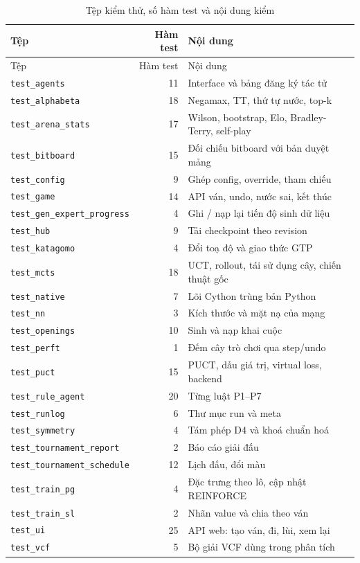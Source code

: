 \par{\footnotesize
\renewcommand{\arraystretch}{0.95}
\begin{longtable}{lrp{8.2cm}}
  \caption{Tệp kiểm thử, số hàm test và nội dung kiểm}\label{tab:cs-kiem-thu}\\
    \toprule
    Tệp & Hàm test & Nội dung \\
    \midrule
  \endfirsthead
    \toprule
    Tệp & Hàm test & Nội dung \\
    \midrule
  \endhead
    \bottomrule
  \endfoot
    \texttt{test\_agents} & 11 & Interface và bảng đăng ký tác tử \\
    \texttt{test\_alphabeta} & 18 & Negamax, TT, thứ tự nước, top-k \\
    \texttt{test\_arena\_stats} & 17 & Wilson, bootstrap, Elo, Bradley-Terry, self-play \\
    \texttt{test\_bitboard} & 15 & Đối chiếu bitboard với bản duyệt mảng \\
    \texttt{test\_config} & 9 & Ghép config, override, tham chiếu \\
    \texttt{test\_game} & 14 & API ván, undo, nước sai, kết thúc \\
    \texttt{test\_gen\_expert\_progress} & 4 & Ghi / nạp lại tiến độ sinh dữ liệu \\
    \texttt{test\_hub} & 9 & Tải checkpoint theo revision \\
    \texttt{test\_katagomo} & 4 & Đổi toạ độ và giao thức GTP \\
    \texttt{test\_mcts} & 18 & UCT, rollout, tái sử dụng cây, chiến thuật gốc \\
    \texttt{test\_native} & 7 & Lõi Cython trùng bản Python \\
    \texttt{test\_nn} & 3 & Kích thước và mặt nạ của mạng \\
    \texttt{test\_openings} & 10 & Sinh và nạp khai cuộc \\
    \texttt{test\_perft} & 1 & Đếm cây trò chơi qua step/undo \\
    \texttt{test\_puct} & 15 & PUCT, dấu giá trị, virtual loss, backend \\
    \texttt{test\_rule\_agent} & 20 & Từng luật P1--P7 \\
    \texttt{test\_runlog} & 6 & Thư mục run và meta \\
    \texttt{test\_symmetry} & 4 & Tám phép D4 và khoá chuẩn hoá \\
    \texttt{test\_tournament\_report} & 2 & Báo cáo giải đấu \\
    \texttt{test\_tournament\_schedule} & 12 & Lịch đấu, đổi màu \\
    \texttt{test\_train\_pg} & 4 & Đặc trưng theo lô, cập nhật REINFORCE \\
    \texttt{test\_train\_sl} & 2 & Nhãn value và chia theo ván \\
    \texttt{test\_ui} & 25 & API web: tạo ván, đi, lùi, xem lại \\
    \texttt{test\_vcf} & 5 & Bộ giải VCF dùng trong phân tích \\
\end{longtable}
}
